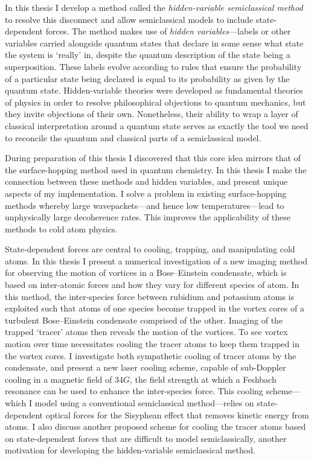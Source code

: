 In this thesis I develop a method called the \emph{hidden-variable semiclassical method} to resolve this disconnect and allow semiclassical models to include state-dependent forces. The method makes use of \emph{hidden variables}---labels or other variables carried alongside quantum states that declare in some sense what state the system is `really' in, despite the quantum description of the state being a superposition. These labels evolve according to rules that ensure the probability of a particular state being declared is equal to its probability as given by the quantum state. Hidden-variable theories were developed as fundamental theories of physics in order to resolve philosophical objections to quantum mechanics, but they invite objections of their own. Nonetheless, their ability to wrap a layer of classical interpretation around a quantum state serves as exactly the tool we need to reconcile the quantum and classical parts of a semiclassical model.

During preparation of this thesis I discovered that this core idea mirrors that of the surface-hopping method used in quantum chemistry. In this thesis I make the connection between these methods and hidden variables, and present unique aspects of my implementation. I solve a problem in existing surface-hopping methods whereby large wavepackets---and hence low temperatures---lead to unphysically large decoherence rates. This improves the applicability of these methods to cold atom physics.

State-dependent forces are central to cooling, trapping, and manipulating cold atoms. In this thesis I present a numerical investigation of a new imaging method for observing the motion of vortices in a Bose--Einstein condensate, which is based on inter-atomic forces and how they vary for different species of atom. In this method, the inter-species force between rubidium and potassium atoms is exploited such that atoms of one species become trapped in the vortex cores of a turbulent Bose--Einstein condensate comprised of the other. Imaging of the trapped `tracer' atoms then reveals the motion of the vortices. To see vortex motion over time necessitates cooling the tracer atoms to keep them trapped in the vortex cores. I investigate both sympathetic cooling of tracer atoms by the condensate, and present a new laser cooling scheme, capable of sub-Doppler cooling in a magnetic field of $34\unit{G}$, the field strength at which a Feshbach resonance can be used to enhance the inter-species force. This cooling scheme---which I model using a conventional semiclassical method---relies on state-dependent optical forces for the Sisyphean effect that removes kinetic energy from atoms. I also discuss another proposed scheme for cooling the tracer atoms based on state-dependent forces that are difficult to model semiclassically, another motivation for developing the hidden-variable semiclassical method.

